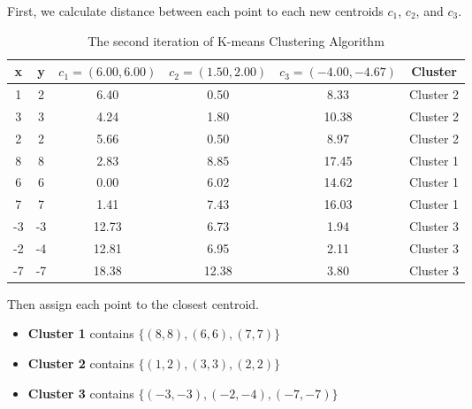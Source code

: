 \documentclass[12pt, a4paper]{article}
\begin{document}
\begin{enumerate}
            First, we calculate distance between each point to each new centroids $c_{1}$, $c_{2}$, and $c_{3}$.
            \begin{table}[h]
                \centering
                \caption{The second iteration of K-means Clustering Algorithm}
                \begin{tabular}{|c|c|c|c|c|c|}
                    \hline
                    \rule{0pt}{2.5ex}
                    x & y & $c_{1} = (6.00, 6.00)$ & $c_{2} = (1.50, 2.00)$ & $c_{3} = (-4.00, -4.67)$ & Cluster \\
                    \hline
                    1 & 2 & 6.40 & 0.50 & 8.33 & Cluster 2 \\
                    3 & 3 & 4.24 & 1.80 & 10.38 & Cluster 2 \\
                    2 & 2 & 5.66 & 0.50 & 8.97  & Cluster 2 \\
                    8 & 8 & 2.83 & 8.85 & 17.45 & Cluster 1 \\
                    6 & 6 & 0.00 & 6.02 & 14.62 & Cluster 1 \\
                    7 & 7 & 1.41 & 7.43 & 16.03 & Cluster 1 \\
                    -3 & -3 & 12.73 & 6.73 & 1.94 & Cluster 3 \\
                    -2 & -4 & 12.81 & 6.95 & 2.11 & Cluster 3 \\
                    -7 & -7 & 18.38 & 12.38 & 3.80 & Cluster 3 \\
                    \hline
                \end{tabular}
            \end{table}

            Then assign each point to the closest centroid.

            \begin{itemize}
                \item \textbf{Cluster 1} contains $\lbrace(8, 8), (6, 6), (7, 7)\rbrace$
                \item \textbf{Cluster 2} contains $\lbrace(1, 2), (3, 3), (2, 2)\rbrace$
                \item \textbf{Cluster 3} contains $\lbrace(-3, -3), (-2, -4), (-7, -7)\rbrace$
            \end{itemize}


\end{enumerate}
\end{document}
